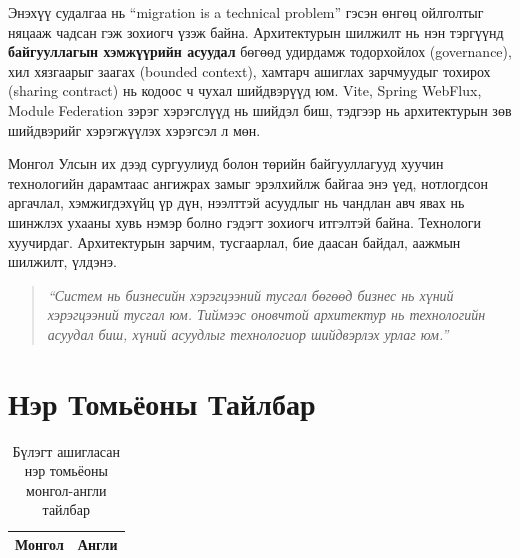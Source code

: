 Энэхүү судалгаа нь ``migration is a technical problem'' гэсэн өнгөц
ойлголтыг няцааж чадсан гэж зохиогч үзэж байна. Архитектурын шилжилт нь
нэн тэргүүнд \textbf{байгууллагын хэмжүүрийн асуудал} бөгөөд удирдамж
тодорхойлох (governance), хил хязгаарыг заагах (bounded context),
хамтарч ашиглах зарчмуудыг тохирох (sharing contract) нь кодоос ч чухал
шийдвэрүүд юм. Vite, Spring WebFlux, Module Federation зэрэг хэрэгслүүд
нь шийдэл биш, тэдгээр нь архитектурын зөв шийдвэрийг хэрэгжүүлэх
хэрэгсэл л мөн.

Монгол Улсын их дээд сургуулиуд болон төрийн байгууллагууд хуучин
технологийн дарамтаас ангижрах замыг эрэлхийлж байгаа энэ үед,
нотлогдсон аргачлал, хэмжигдэхүйц үр дүн, нээлттэй асуудлыг нь чандлан
авч явах нь шинжлэх ухааны хувь нэмэр болно гэдэгт зохиогч итгэлтэй байна.
Технологи хуучирдаг. Архитектурын зарчим, тусгаарлал, бие даасан байдал,
аажмын шилжилт, үлдэнэ.

\begin{quote}
\itshape
``Систем нь бизнесийн хэрэгцээний тусгал бөгөөд бизнес нь хүний
хэрэгцээний тусгал юм. Тиймээс оновчтой архитектур нь технологийн
асуудал биш, хүний асуудлыг технологиор шийдвэрлэх урлаг юм.''
\end{quote}

\section*{Нэр Томьёоны Тайлбар}

\begin{table}[H]
    \centering
    \caption{Бүлэгт ашигласан нэр томьёоны монгол-англи тайлбар}
    \label{tab:glossary}
    \renewcommand{\arraystretch}{0.7}
    \begin{tabular}{ll}
        \toprule
        \textbf{Монгол} & \textbf{Англи} \\
        \midrule
        \bottomrule
    \end{tabular}
\end{table}
